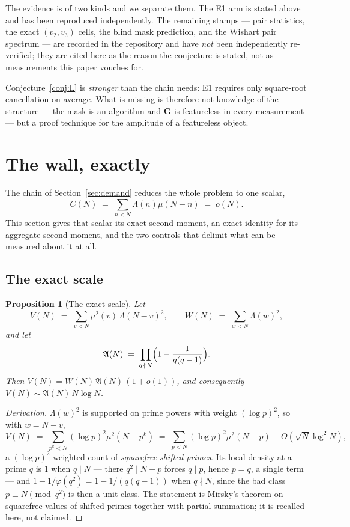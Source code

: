 \documentclass[11pt,a4paper]{article}
\theoremstyle{plain}
\newtheorem{proposition}[theorem]{Proposition}
\theoremstyle{definition}
\newcommand{\AAA}{\mathfrak{A}}
\begin{document}
The evidence is of two kinds and we separate them. The E1 arm is stated
above and has been reproduced independently. The remaining stamps ---
pair statistics, the exact $(v_2,v_3)$ cells, the blind mask
prediction, and the Wishart pair spectrum --- are recorded in the
repository and have \emph{not} been independently re-verified; they are
cited here as the reason the conjecture is stated, not as measurements
this paper vouches for.

Conjecture~\ref{conj:L} is \emph{stronger} than the chain needs: E1
requires only square-root cancellation on average. What is missing is
therefore not knowledge of the structure --- the mask is an algorithm
and $\mathbf G$ is featureless in every measurement --- but a proof
technique for the amplitude of a featureless object.

\section{The wall, exactly}\label{sec:wall}

The chain of Section~\ref{sec:demand} reduces the whole problem to one
scalar,
\[
  C(N) \;=\; \sum_{n<N}\Lambda(n)\mu(N-n) \;=\; o(N).
\]
This section gives that scalar its exact second moment, an exact
identity for its aggregate second moment, and the two controls that
delimit what can be measured about it at all.

\subsection{The exact scale}

\begin{proposition}[The exact scale]\label{prop:V}
Let
\[
  V(N) \;=\; \sum_{v<N}\mu^2(v)\,\Lambda(N-v)^2,
  \qquad
  W(N) \;=\; \sum_{w<N}\Lambda(w)^2,
\]
and let
\[
  \AAA(N) \;=\; \prod_{q\,\nmid\,N}\Bigl(1-\frac{1}{q(q-1)}\Bigr).
\]
Then $V(N) = W(N)\,\AAA(N)\,(1+o(1))$, and consequently
$V(N) \sim \AAA(N)\,N\log N$.
\end{proposition}

\begin{proof}[Derivation]
$\Lambda(w)^2$ is supported on prime powers with weight $(\log p)^2$,
so with $w=N-v$,
\[
  V(N) \;=\; \sum_{p^k<N}(\log p)^2\mu^2(N-p^k)
        \;=\; \sum_{p<N}(\log p)^2\mu^2(N-p) + O(\sqrt N\log^2 N),
\]
a $(\log p)^2$-weighted count of \emph{squarefree shifted primes}. Its
local density at a prime $q$ is $1$ when $q\mid N$ --- there
$q^2\mid N-p$ forces $q\mid p$, hence $p=q$, a single term --- and
$1-1/\varphi(q^2) = 1-1/(q(q-1))$ when $q\nmid N$, since the bad class
$p\equiv N \pmod{q^2}$ is then a unit class. The statement is Mirsky's
theorem on squarefree values of shifted primes \cite{Mir49} together
with partial summation; it is recalled here, not claimed.
\end{proof}
\end{document}
